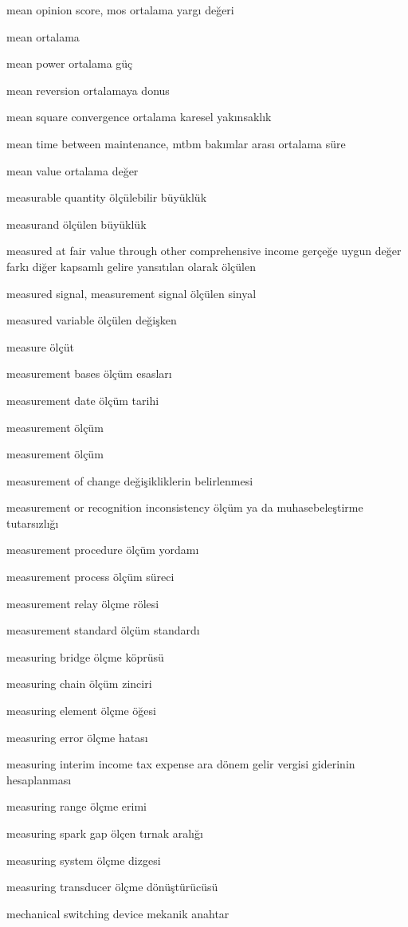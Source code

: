\documentclass[12pt,fleqn]{article}\usepackage{../../common}
\begin{document}
mean opinion score, mos ortalama yargı değeri

mean ortalama

mean power ortalama güç

mean reversion ortalamaya donus

mean square convergence ortalama karesel yakınsaklık

mean time between maintenance, mtbm bakımlar arası ortalama süre

mean value ortalama değer

measurable quantity ölçülebilir büyüklük

measurand ölçülen büyüklük

measured at fair value through other comprehensive income gerçeğe uygun değer farkı diğer kapsamlı gelire yansıtılan olarak ölçülen

measured signal, measurement signal ölçülen sinyal

measured variable ölçülen değişken

measure ölçüt

measurement bases ölçüm esasları

measurement date ölçüm tarihi

measurement ölçüm

measurement ölçüm

measurement of change değişikliklerin belirlenmesi

measurement or recognition inconsistency ölçüm ya da muhasebeleştirme tutarsızlığı

measurement procedure ölçüm yordamı

measurement process ölçüm süreci

measurement relay ölçme rölesi

measurement standard ölçüm standardı

measuring bridge ölçme köprüsü

measuring chain ölçüm zinciri

measuring element ölçme öğesi

measuring error ölçme hatası

measuring interim income tax expense ara dönem gelir vergisi giderinin hesaplanması

measuring range ölçme erimi

measuring spark gap ölçen tırnak aralığı

measuring system ölçme dizgesi

measuring transducer ölçme dönüştürücüsü

mechanical switching device mekanik anahtar
\end{document}
